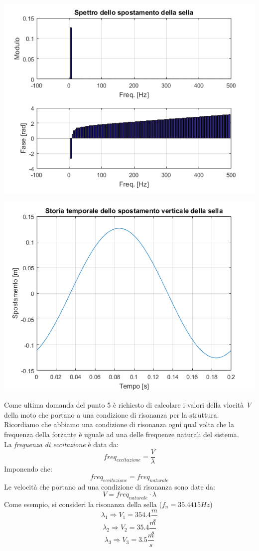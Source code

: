 \documentclass[12pt, a4paper]{article}
\begin{document}
	\begin{center}
		\includegraphics[scale=0.8]{spettro_5b}
	\end{center}
	
	\begin{center}
		\includegraphics[scale=0.8]{storiatemporale_5b}
	\end{center}
	\clearpage
	Come ultima domanda del punto 5 è richiesto di calcolare i valori della vlocità \textit{V} della moto che portano a una condizione di risonanza per la struttura. Ricordiamo che abbiamo una condizione di risonanza ogni qual volta che la frequenza della forzante è uguale ad una delle frequenze naturali del sistema.\\
	La \textit{frequenza di eccitazione} è data da:
	\[freq_{eccitazione}=\dfrac{V}{\lambda}\]
	Imponendo che:
	\[freq_{eccitazione}=freq_{naturale}\]
	Le velocità che portano ad una condizione di risonanza sono date da:
	\[V=freq_{naturale} \cdot \lambda\]
	Come esempio, si consideri la risonanza della sella ($f_{n}=35.4415Hz$)
	\[\lambda_{1} \Rightarrow V_{1}= 354.4 \frac{m}{s}\]
	\[\lambda_{2} \Rightarrow V_{2}= 35.4 \frac{m}{s}\]
	\[\lambda_{3} \Rightarrow V_{3}= 3.5 \frac{m}{s}\]
	
\end{document}
